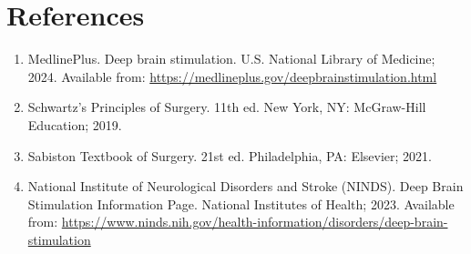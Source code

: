 \section*{References}
\begin{enumerate}
  \item MedlinePlus. Deep brain stimulation. U.S. National Library of Medicine; 2024. Available from: \url{https://medlineplus.gov/deepbrainstimulation.html}
  
  \item Schwartz's Principles of Surgery. 11th ed. New York, NY: McGraw-Hill Education; 2019.
  
  \item Sabiston Textbook of Surgery. 21st ed. Philadelphia, PA: Elsevier; 2021.
  
  \item National Institute of Neurological Disorders and Stroke (NINDS). Deep Brain Stimulation Information Page. National Institutes of Health; 2023. Available from: \url{https://www.ninds.nih.gov/health-information/disorders/deep-brain-stimulation}
\end{enumerate}

\clearpage
